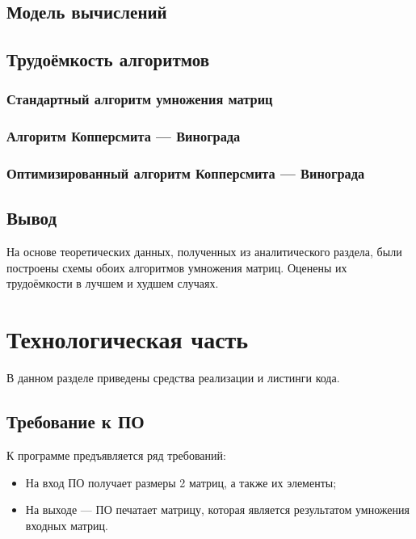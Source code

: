 \documentclass[12pt]{report}
\begin{document}
\section{Модель вычислений}

\section{Трудоёмкость алгоритмов}

\subsection{Стандартный алгоритм умножения матриц}

\subsection{Алгоритм Копперсмита — Винограда}

\subsection{Оптимизированный алгоритм Копперсмита — Винограда}

\section{Вывод}
	На основе теоретических данных, полученных из аналитического раздела, были построены схемы обоих алгоритмов умножения матриц.  Оценены их трудоёмкости в лучшем и худшем случаях.

\chapter{Технологическая часть}

В данном разделе приведены средства реализации и листинги кода.

\section{Требование к ПО}

К программе предъявляется ряд требований:

\begin{itemize}

	\item На вход ПО получает размеры 2 матриц, а также их элементы;

	\item На выходе — ПО печатает матрицу, которая является результатом умножения входных матриц.

\end{itemize}
\end{document}
